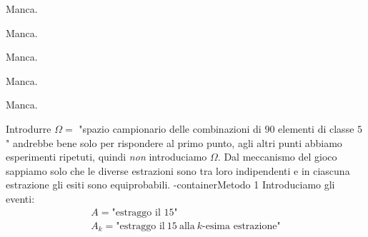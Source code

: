 \Soluzione

Manca.
\Soluzione

Manca.
\Soluzione

Manca.
\Soluzione

Manca.
\Soluzione

Manca.
\Soluzione

Introdurre $\Omega =$ "spazio campionario delle combinazioni di $90$ elementi di classe $5$" andrebbe bene solo per rispondere al primo punto, agli altri punti abbiamo esperimenti ripetuti, quindi \textit{non} introduciamo $\Omega $. Dal meccanismo del gioco sappiamo solo che le diverse estrazioni sono tra loro indipendenti e in ciascuna estrazione gli esiti sono equiprobabili.
\boxed-container{Metodo 1}
Introduciamo gli eventi:
\begin{gather*}
A=\text{"estraggo il 15"}\\
A_{k} =\text{"estraggo il} \ 15\ \text{alla} \ k\text{-esima estrazione"}
\end{gather*}
